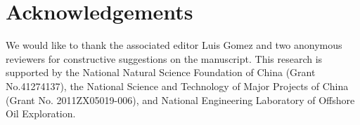 \section{Acknowledgements}
We would like to thank the associated editor Luis Gomez and two anonymous reviewers for constructive suggestions on the manuscript. This research is supported by the National Natural Science Foundation of China (Grant No.41274137), the National Science and Technology of Major Projects of China (Grant No. 2011ZX05019-006), and National Engineering Laboratory of Offshore Oil Exploration.



